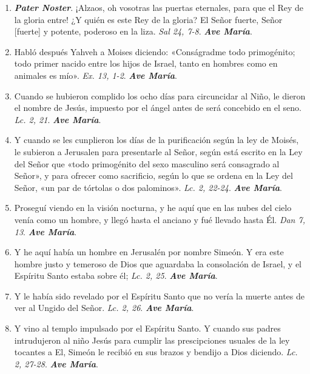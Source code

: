 \documentclass[../../devocionario.tex]{subfiles}
\begin{document}
    \begin{enumerate}
        \item \textbf{\emph{Pater Noster}}. ¡Alzaos, oh vosotras las puertas eternales, para que el Rey de la gloria entre!
            ¿Y quién es este Rey de la gloria? El Señor fuerte, Señor [fuerte] y potente, poderoso en la liza. \emph{Sal 24, 7-8}. \textbf{\emph{Ave María}}.

        \item Habló después Yahveh a Moises diciendo: «Conságradme todo primogénito; todo primer nacido entre los hijos de Israel, tanto en hombres como en animales es mío». 
            \emph{Ex. 13, 1-2}. \textbf{\emph{Ave María}}.

        \item Cuando se hubieron complido los ocho días para circuncidar al Niño, le dieron el nombre de Jesús, impuesto por el ángel antes de será concebido en el seno. 
            \emph{Lc. 2, 21}. \textbf{\emph{Ave María}}.

        \item Y cuando se les cunplieron los días de la purificación según la ley de Moisés, le subieron a Jerusalen para presentarle al Señor, 
            según está escrito en la Ley del Señor que «todo primogénito del sexo masculino será consagrado al Señor», 
            y para ofrecer como sacrificio, según lo que se ordena en la Ley del Señor, «un par de tórtolas o dos palominos». \emph{Lc. 2, 22-24}. \textbf{\emph{Ave María}}.

        \item Proseguí viendo en la visión nocturna, y he aquí que en las nubes del cielo venía como un hombre, y llegó hasta el anciano y fué llevado hasta Él. 
            \emph{Dan 7, 13}. \textbf{\emph{Ave María}}.

        \item Y he aquí había un hombre en Jerusalén por nombre Simeón. Y era este hombre justo y temeroso de Dios que aguardaba la consolación de Israel, 
            y el Espíritu Santo estaba sobre él; \emph{Lc. 2, 25}. \textbf{\emph{Ave María}}.

        \item Y le había sido revelado por el Espíritu Santo que no vería la muerte antes de ver al Ungido del Señor. \emph{Lc. 2, 26}. \textbf{\emph{Ave María}}.

        \item Y vino al templo impulsado por el Espíritu Santo. Y cuando sus padres intrudujeron al niño Jesús para cumplir 
            las prescipciones usuales de la ley tocantes a El, Simeón le recibió en sus brazos y bendijo a Dios diciendo. \emph{Lc. 2, 27-28}. \textbf{\emph{Ave María}}.


\end{enumerate}
\end{document}
